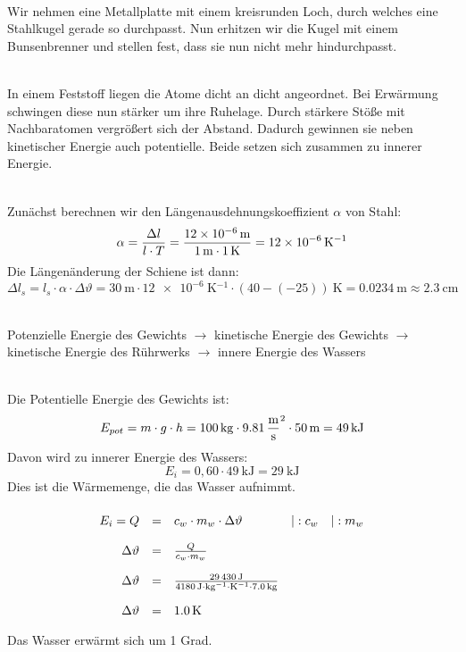 \documentclass[a4paper]{article}
\begin{document}
\vspace{0.5 cm}


\\
Wir nehmen eine Metallplatte mit einem kreisrunden Loch, durch welches eine Stahlkugel gerade so durchpasst. Nun erhitzen wir die Kugel mit einem Bunsenbrenner und stellen fest, dass sie nun nicht mehr hindurchpasst.
\vspace{0.5 cm}

\\ 
In einem Feststoff liegen die Atome dicht an dicht angeordnet. Bei Erwärmung schwingen diese nun stärker um ihre Ruhelage. Durch stärkere Stöße mit Nachbaratomen vergrößert sich der Abstand. Dadurch gewinnen sie neben kinetischer Energie auch potentielle. Beide setzen sich zusammen zu innerer Energie.
\vspace{0.5 cm}

\\
Zunächst berechnen wir den Längenausdehnungskoeffizient $\alpha$ von Stahl:
$$\alpha = {\Delta l \over l \cdot T} = {\SI{12e-6}{\meter}\over \SI{1}{\meter}\cdot \SI{1}{\kelvin}}=
\SI{12e-6}{\kelvin^{-1}}$$
Die Längenänderung der Schiene ist dann:
$$\Delta l_s = l_s \cdot \alpha \cdot \Delta \vartheta = \SI{30}{\meter} \cdot \SI{12e-6}{\kelvin^{-1}}\cdot (40-(-25))\SI{}{\kelvin} =\SI{0,0234}{\meter} \approx \SI{2,3}{\centi\meter}$$ 
\vspace{0.5 cm}

\\
Potenzielle Energie des Gewichts $\rightarrow$ kinetische Energie des Gewichts $\rightarrow$ kinetische Energie des Rührwerks  $\rightarrow$ innere Energie des Wassers
\vspace{0.5 cm}

\\
Die Potentielle Energie des Gewichts ist:
$$E_{pot} = m \cdot g \cdot h = \SI{100}{\kilogram} \cdot \SI{9,81}{\meter\over \second^2}\cdot \SI{50}{\meter} = \SI{49}{\kilo\joule}$$
Davon wird zu innerer Energie des Wassers:
$$E_i = 0,60 \cdot \SI{49}{\kilo\joule} = \SI{29}{\kilo\joule}$$
Dies ist die Wärmemenge, die das Wasser aufnimmt.
$$
\renewcommand{\arraystretch}{2}
\begin{array}{rcll}
E_i = Q &=& c_w \cdot m_w \cdot \Delta \vartheta &|: c_w \quad |:m_w\\
\Delta \vartheta &=& {Q \over c_w \cdot m_w}\\
\Delta \vartheta &=& {\SI{29430}{\joule} \over \SI{4180}{\joule\cdot\kilogram^{-1}\cdot \kelvin^{-1}}\cdot \SI{7,0}{\kilogram}}\\
\Delta \vartheta &=& \SI{1,0}{\kelvin}
\end{array}
$$
Das Wasser erwärmt sich um 1 Grad.
\vspace{0.5 cm}
\end{document}
